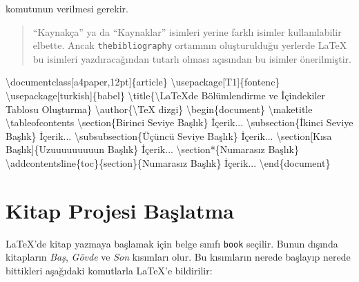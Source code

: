 \documentclass[
  10pt,
]{scrbook}
\newenvironment{Shaded}{\begin{snugshade}}{\end{snugshade}}
\newcommand{\NormalTok}[1]{#1}
\newcommand{\SpecialCharTok}[1]{\textcolor[rgb]{0.00,0.00,0.00}{#1}}
\newcommand{\StringTok}[1]{\textcolor[rgb]{0.31,0.60,0.02}{#1}}
\begin{document}
komutunun verilmesi gerekir.

\begin{quote}
``Kaynakça'' ya da ``Kaynaklar'' isimleri yerine farklı isimler
kullanılabilir elbette. Ancak \texttt{thebibliography} ortamının
oluşturulduğu yerlerde LaTeX bu isimleri yazdıracağından tutarlı
olması açısından bu isimler önerilmiştir.
\end{quote}

\begin{Shaded}
\begin{Highlighting}[]
\NormalTok{\textbackslash{}documentclass[a4paper,12pt]\{article\}}
\NormalTok{\textbackslash{}usepackage[T1]\{fontenc\}}
\NormalTok{\textbackslash{}usepackage[turkish]\{babel\}}
\NormalTok{\textbackslash{}title\{\textbackslash{}LaTeX}\StringTok{\textquotesingle{}de Bölümlendirme  ve İçindekiler Tablosu Oluşturma\}}
\SpecialCharTok{\textbackslash{}a}\StringTok{uthor\{\textbackslash{}TeX dizgi\}}
\SpecialCharTok{\textbackslash{}b}\StringTok{egin\{document\}}
\StringTok{\textbackslash{}maketitle}
\SpecialCharTok{\textbackslash{}t}\StringTok{ableofcontents}
\StringTok{\textbackslash{}section\{Birinci Seviye Başlık\}}
\StringTok{  İçerik...}
\StringTok{\textbackslash{}subsection\{İkinci Seviye Başlık\}}
\StringTok{  İçerik...}
\StringTok{\textbackslash{}subsubsection\{Üçüncü Seviye Başlık\}}
\StringTok{  İçerik...}
\StringTok{\textbackslash{}section[Kısa Başlık]\{Uzuuuuuuuuun Başlık\}}
\StringTok{  İçerik...}
\StringTok{\textbackslash{}section*\{Numarasız Başlık\}}
\SpecialCharTok{\textbackslash{}a}\StringTok{ddcontentsline\{toc\}\{section\}\{Numarasız Başlık\}}
\StringTok{  İçerik...}
\SpecialCharTok{\textbackslash{}e}\StringTok{nd\{document\}}
\end{Highlighting}
\end{Shaded}

\hypertarget{kitap-projesi-baux15flatma}{%
\section{Kitap Projesi Başlatma}\label{kitap-projesi-baux15flatma}}

LaTeX'de kitap yazmaya başlamak için belge sınıfı \texttt{book} seçilir. Bunun
dışında kitapların \emph{Baş}, \emph{Gövde} ve \emph{Son} kısımları olur. Bu kısımların
nerede başlayıp nerede bittikleri aşağıdaki komutlarla LaTeX'e
bildirilir:
\end{document}
